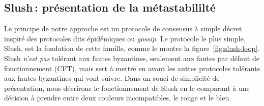 \documentclass[letterpaper,twocolumn,10pt]{article}
\DeclarePairedDelimiter{\floor}{\lfloor}{\rfloor}
\theoremstyle{definition}
\begin{document}
\subsection{Slush\,: présentation de la métastabililté}


Le principe de notre approche est un protocole de consensus à simple décret inspiré des protocoles dits épidémiques
ou \emph{gossip}. Le protocole le plus simple, Slush, est la fondation de cette famille, comme le montre la
figure~\ref{fig:slush-loop}. Slush \emph{n'est pas} tolérant aux fautes byzantines, seulement aux fautes par défaut %
de fonctionnement (CFT), mais sert à mettre en avant les autres protocoles tolérants aux fautes byzantines qui vont
suivre. Dans un souci de simplicité de présentation, nous décrirons le fonctionnement de Slush en le comparant
à une décision à prendre entre deux couleurs incompatibles, le rouge et le bleu.

\end{document}
